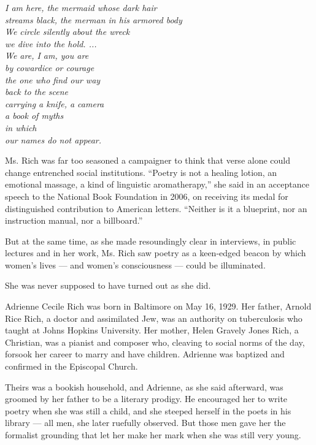 \emph{I am here, the mermaid whose dark hair}\\
\emph{streams black, the merman in his armored body}\\
\emph{We circle silently about the wreck}\\
\emph{we dive into the hold. ...}\\
\emph{We are, I am, you are}\\
\emph{by cowardice or courage}\\
\emph{the one who find our way}\\
\emph{back to the scene}\\
\emph{carrying a knife, a camera}\\
\emph{a book of myths}\\
\emph{in which}\\
\emph{our names do not appear.}

Ms. Rich was far too seasoned a campaigner to think that verse alone
could change entrenched social institutions. ``Poetry is not a healing
lotion, an emotional massage, a kind of linguistic aromatherapy,'' she
said in an acceptance speech to the National Book Foundation in 2006, on
receiving its medal for distinguished contribution to American letters.
``Neither is it a blueprint, nor an instruction manual, nor a
billboard.''

But at the same time, as she made resoundingly clear in interviews, in
public lectures and in her work, Ms. Rich saw poetry as a keen-edged
beacon by which women's lives --- and women's consciousness --- could be
illuminated.

She was never supposed to have turned out as she did.

Adrienne Cecile Rich was born in Baltimore on May 16, 1929. Her father,
Arnold Rice Rich, a doctor and assimilated Jew, was an authority on
tuberculosis who taught at Johns Hopkins University. Her mother, Helen
Gravely Jones Rich, a Christian, was a pianist and composer who,
cleaving to social norms of the day, forsook her career to marry and
have children. Adrienne was baptized and confirmed in the Episcopal
Church.

Theirs was a bookish household, and Adrienne, as she said afterward, was
groomed by her father to be a literary prodigy. He encouraged her to
write poetry when she was still a child, and she steeped herself in the
poets in his library --- all men, she later ruefully observed. But those
men gave her the formalist grounding that let her make her mark when she
was still very young.

